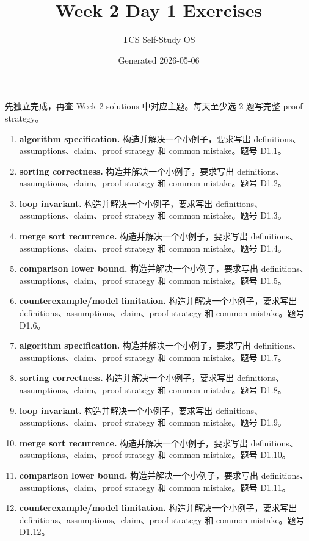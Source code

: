 \documentclass[11pt]{ctexart}
\title{Week 2 Day 1 Exercises}
\author{TCS Self-Study OS}
\date{Generated 2026-05-06}
\begin{document}
\maketitle
先独立完成，再查 Week 2 solutions 中对应主题。每天至少选 2 题写完整 proof strategy。
\begin{enumerate}
  \item \textbf{algorithm specification.} 构造并解决一个小例子，要求写出 definitions、assumptions、claim、proof strategy 和 common mistake。题号 D1.1。
  \item \textbf{sorting correctness.} 构造并解决一个小例子，要求写出 definitions、assumptions、claim、proof strategy 和 common mistake。题号 D1.2。
  \item \textbf{loop invariant.} 构造并解决一个小例子，要求写出 definitions、assumptions、claim、proof strategy 和 common mistake。题号 D1.3。
  \item \textbf{merge sort recurrence.} 构造并解决一个小例子，要求写出 definitions、assumptions、claim、proof strategy 和 common mistake。题号 D1.4。
  \item \textbf{comparison lower bound.} 构造并解决一个小例子，要求写出 definitions、assumptions、claim、proof strategy 和 common mistake。题号 D1.5。
  \item \textbf{counterexample/model limitation.} 构造并解决一个小例子，要求写出 definitions、assumptions、claim、proof strategy 和 common mistake。题号 D1.6。
  \item \textbf{algorithm specification.} 构造并解决一个小例子，要求写出 definitions、assumptions、claim、proof strategy 和 common mistake。题号 D1.7。
  \item \textbf{sorting correctness.} 构造并解决一个小例子，要求写出 definitions、assumptions、claim、proof strategy 和 common mistake。题号 D1.8。
  \item \textbf{loop invariant.} 构造并解决一个小例子，要求写出 definitions、assumptions、claim、proof strategy 和 common mistake。题号 D1.9。
  \item \textbf{merge sort recurrence.} 构造并解决一个小例子，要求写出 definitions、assumptions、claim、proof strategy 和 common mistake。题号 D1.10。
  \item \textbf{comparison lower bound.} 构造并解决一个小例子，要求写出 definitions、assumptions、claim、proof strategy 和 common mistake。题号 D1.11。
  \item \textbf{counterexample/model limitation.} 构造并解决一个小例子，要求写出 definitions、assumptions、claim、proof strategy 和 common mistake。题号 D1.12。
\end{enumerate}
\end{document}
